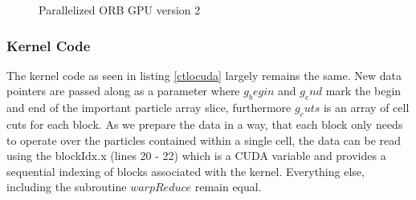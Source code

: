 \documentclass[]{article}
\begin{document}
\begin{figure}[H]
	\begin{center}
	\end{center}
	\caption{Parallelized ORB GPU version 2}
	\label{fig:orbgpup2}
\end{figure}


\subsubsection{Kernel Code}

The kernel code as seen in listing \ref{ctlocuda} largely remains the same. New data pointers are passed along as a parameter where $g_begin$ and $g_end$ mark the begin and end of the important particle array slice, furthermore $g_cuts$ is an array of cell cuts for each block. As we prepare the data in a way, that each block only needs to operate over the particles contained within a single cell, the data can be read using the blockIdx.x (lines 20 - 22) which is a CUDA variable and provides a sequential indexing of blocks associated with the kernel. Everything else, including the subroutine $warpReduce$ remain equal. 
\end{document}
